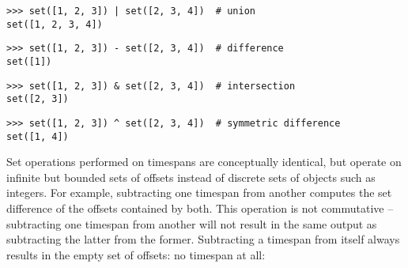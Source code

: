 \begin{comment}
<abjad>
set([1, 2, 3]) | set([2, 3, 4])  # union
set([1, 2, 3]) - set([2, 3, 4])  # difference
set([1, 2, 3]) & set([2, 3, 4])  # intersection
set([1, 2, 3]) ^ set([2, 3, 4])  # symmetric difference
</abjad>
\end{comment}

\begin{abjadbookoutput}
\begin{singlespacing}
\vspace{-0.5\baselineskip}
\begin{verbatim}
>>> set([1, 2, 3]) | set([2, 3, 4])  # union
set([1, 2, 3, 4])
\end{verbatim}
\begin{verbatim}
>>> set([1, 2, 3]) - set([2, 3, 4])  # difference
set([1])
\end{verbatim}
\begin{verbatim}
>>> set([1, 2, 3]) & set([2, 3, 4])  # intersection
set([2, 3])
\end{verbatim}
\begin{verbatim}
>>> set([1, 2, 3]) ^ set([2, 3, 4])  # symmetric difference
set([1, 4])
\end{verbatim}
\end{singlespacing}
\end{abjadbookoutput}

\noindent Set operations performed on timespans are conceptually identical, but
operate on infinite but bounded sets of offsets instead of discrete sets of
objects such as integers. For example, subtracting one timespan from another
computes the set difference of the offsets contained by both. This operation is
not commutative -- subtracting one timespan from another will not result in the
same output as subtracting the latter from the former. Subtracting a timespan
from itself always results in the empty set of offsets: no timespan at all:

\begin{comment}
<abjad>
result = timespantools.Timespan(0, 10) - timespantools.Timespan(0, 10)
print(format(result))
result = timespantools.Timespan(0, 10) - timespantools.Timespan(5, 15)
print(format(result))
result = timespantools.Timespan(0, 10) - timespantools.Timespan(10, 20)
print(format(result))
result = timespantools.Timespan(5, 15) - timespantools.Timespan(0, 10)
print(format(result))
result = timespantools.Timespan(5, 15) - timespantools.Timespan(5, 15)
print(format(result))
result = timespantools.Timespan(5, 15) - timespantools.Timespan(10, 20)
print(format(result))
result = timespantools.Timespan(10, 20) - timespantools.Timespan(0, 10)
print(format(result))
result = timespantools.Timespan(10, 20) - timespantools.Timespan(5, 15)
print(format(result))
result = timespantools.Timespan(10, 20) - timespantools.Timespan(10, 20)
print(format(result))
</abjad>
\end{comment}

